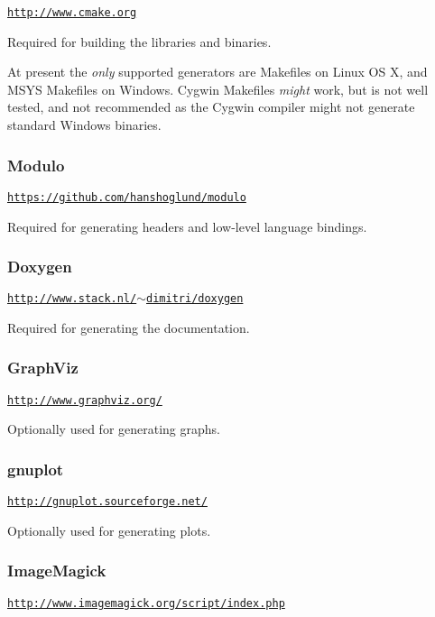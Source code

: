 \href{http://www.cmake.org}{\tt http\-://www.\-cmake.\-org}

Required for building the libraries and binaries.

At present the {\itshape only} supported generators are Makefiles on Linux O\-S X, and M\-S\-Y\-S Makefiles on Windows. Cygwin Makefiles {\itshape might} work, but is not well tested, and not recommended as the Cygwin compiler might not generate standard Windows binaries.

\subsubsection*{Modulo}

\href{https://github.com/hanshoglund/modulo}{\tt https\-://github.\-com/hanshoglund/modulo}

Required for generating headers and low-\/level language bindings.

\subsubsection*{Doxygen}

\href{http://www.stack.nl/~dimitri/doxygen}{\tt http\-://www.\-stack.\-nl/$\sim$dimitri/doxygen}

Required for generating the documentation.

\subsubsection*{Graph\-Viz}

\href{http://www.graphviz.org/}{\tt http\-://www.\-graphviz.\-org/}

Optionally used for generating graphs.

\subsubsection*{gnuplot}

\href{http://gnuplot.sourceforge.net/}{\tt http\-://gnuplot.\-sourceforge.\-net/}

Optionally used for generating plots.

\subsubsection*{Image\-Magick}

\href{http://www.imagemagick.org/script/index.php}{\tt http\-://www.\-imagemagick.\-org/script/index.\-php}

